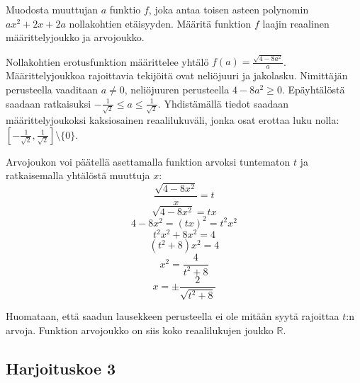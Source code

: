 \begin{tehtava}
	\begin{vastaus}
	\end{vastaus}
\end{tehtava}

\begin{tehtava}
Muodosta muuttujan $a$ funktio $f$, joka antaa toisen asteen polynomin $ax^2+2x+2a$ nollakohtien etäisyyden. Määritä funktion $f$ laajin reaalinen määrittelyjoukko ja arvojoukko.
	\begin{vastaus}
	Nollakohtien erotusfunktion määrittelee yhtälö $f(a)=\frac{\sqrt{4-8a^2}}{a}$. Määrittelyjoukkoa rajoittavia tekijöitä ovat neliöjuuri ja jakolasku. Nimittäjän perusteella vaaditaan $a\neq 0$, neliöjuuren perusteella $4-8a^2\geq 0$. Epäyhtälöstä saadaan ratkaisuksi $-\frac{1}{\sqrt{2}}\leq a \leq \frac{1}{\sqrt{2}}$. Yhdistämällä tiedot saadaan määrittelyjoukoksi kaksiosainen reaalilukuväli, jonka osat erottaa luku nolla: $[-\frac{1}{\sqrt{2}},\frac{1}{\sqrt{2}}] \setminus \lbrace 0 \rbrace$. %
	
Arvojoukon voi päätellä asettamalla funktion arvoksi tuntematon $t$ ja ratkaisemalla yhtälöstä muuttuja $x$:
	$$\frac{\sqrt{4-8x^2}}{x}=t$$
	$$\sqrt{4-8x^2}=tx$$
	$$4-8x^2=(tx)^2=t^2x^2$$
	$$t^2x^2+8x^2=4$$
	$$(t^2+8)x^2=4$$
	$$x^2=\frac{4}{t^2+8}$$
	$$x=\pm \frac{2}{\sqrt{t^2+8}}$$
	
	Huomataan, että saadun lausekkeen perusteella ei ole mitään syytä rajoittaa $t$:n arvoja. Funktion arvojoukko on siis koko reaalilukujen joukko $\mathbb{R}$.
	\end{vastaus}
\end{tehtava}
\newpage
\subsection*{Harjoituskoe 3}


